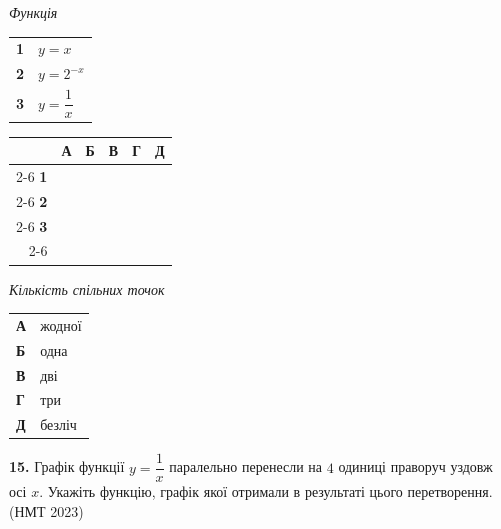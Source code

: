 \documentclass[14pt]{extarticle}
\newcommand{\nmtyear}[1]{\hfill{\small\color{yearcolor}(НМТ #1)}}
\begin{document}
\vspace{0.3cm}

\noindent
\begin{minipage}[t]{0.45\textwidth}
    \textit{Функція} \par \vspace{0.2cm}
    \begin{tabular}{@{}p{0.5cm} p{5cm}@{}}
    \textbf{1} & $y=x$ \\[0.3cm]
    \textbf{2} & $y=2^{-x}$ \\[0.3cm]
    \textbf{3} & $y=\dfrac{1}{x}$ \\
    \end{tabular}
    
    \vspace{0.5cm}
    
    \begingroup
    \setlength{\tabcolsep}{4pt}
    \renewcommand{\arraystretch}{1.2}
    \small
    \begin{tabular}{r|c|c|c|c|c|}
         \multicolumn{1}{c}{} & \multicolumn{1}{c}{\textbf{А}} & \multicolumn{1}{c}{\textbf{Б}} & \multicolumn{1}{c}{\textbf{В}} & \multicolumn{1}{c}{\textbf{Г}} & \multicolumn{1}{c}{\textbf{Д}} \\ \cline{2-6}
         \textbf{1} & & & & & \\ \cline{2-6}
         \textbf{2} & & & & & \\ \cline{2-6}
         \textbf{3} & & & & & \\ \cline{2-6}
    \end{tabular}
    \endgroup
\end{minipage}%
\hfill
\begin{minipage}[t]{0.50\textwidth}
    \textit{Кількість спільних точок} \par \vspace{0.2cm}
    \begin{tabular}{@{}p{0.5cm} p{7.5cm}@{}}
    \textbf{А} & жодної \\[0.3cm]
    \textbf{Б} & одна \\[0.3cm]
    \textbf{В} & дві \\[0.3cm]
    \textbf{Г} & три \\[0.3cm]
    \textbf{Д} & безліч \\
    \end{tabular}
\end{minipage}

\vspace{0.7cm}

\noindent\textbf{15.} Графік функції $y=\dfrac{1}{x}$ паралельно перенесли на $4$ одиниці праворуч уздовж осі $x$. Укажіть функцію, графік якої отримали в результаті цього перетворення. \nmtyear{2023}
\end{document}
